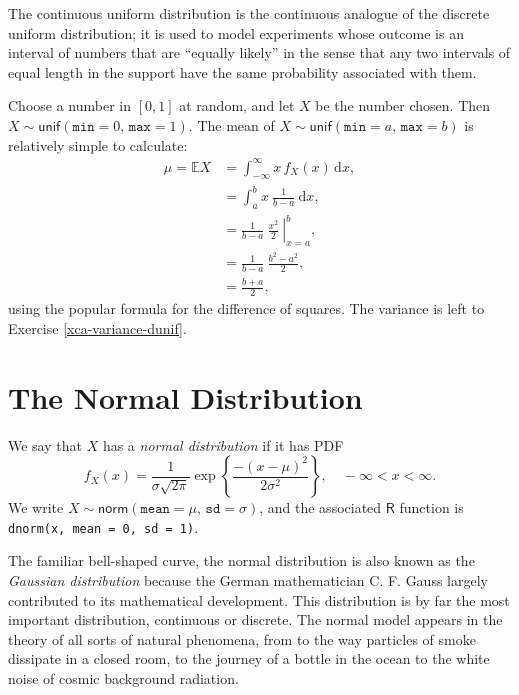 \documentclass[captions=tableheading]{scrbook}
\begin{document}
The continuous uniform distribution is the continuous analogue of the discrete uniform distribution; it is used to model experiments whose outcome is an interval of numbers that are ``equally likely'' in the sense that any two intervals of equal length in the support have the same probability associated with them.

\begin{example}
Choose a number in \( [0,1] \) at random, and let \(X\) be the number chosen. Then \(X\sim\mathsf{unif}(\mathtt{min}=0,\,\mathtt{max}=1)\).
The mean of \(X\sim\mathsf{unif}(\mathtt{min}=a,\,\mathtt{max}=b)\) is relatively simple to calculate:
\begin{align*}
\mu=\mathbb{E} X & =\int_{-\infty}^{\infty}x\, f_{X}(x)\,\mathrm{d} x,\\
 & =\int_{a}^{b}x\ \frac{1}{b-a}\ \mathrm{d} x,\\
 & =\left.\frac{1}{b-a}\ \frac{x^{2}}{2}\ \right|_{x=a}^{b},\\
 & =\frac{1}{b-a}\ \frac{b^{2}-a^{2}}{2},\\
 & =\frac{b+a}{2},
\end{align*}
using the popular formula for the difference of squares. The variance is left to Exercise \ref{xca-variance-dunif}.
\end{example}
\section{The Normal Distribution}
\label{sec-6-3}
\label{sec-The-Normal-Distribution}


We say that \(X\) has a \emph{normal distribution} if it has PDF
\begin{equation}
f_{X}(x)=\frac{1}{\sigma\sqrt{2\pi}}\exp \left\{ \frac{-(x-\mu)^{2}}{2\sigma^{2}} \right\},\quad -\infty < x < \infty.
\end{equation}
We write \(X\sim\mathsf{norm}(\mathtt{mean}=\mu,\,\mathtt{sd}=\sigma)\), and the associated \(\mathsf{R}\) function is \texttt{dnorm(x, mean = 0, sd = 1)}.

The familiar bell-shaped curve, the normal distribution is also known as the \emph{Gaussian distribution} because the German mathematician C. F. Gauss largely contributed to its mathematical development. This distribution is by far the most important distribution, continuous or discrete. The normal model appears in the theory of all sorts of natural phenomena, from to the way particles of smoke dissipate in a closed room, to the journey of a bottle in the ocean to the white noise of cosmic background radiation.
\end{document}
